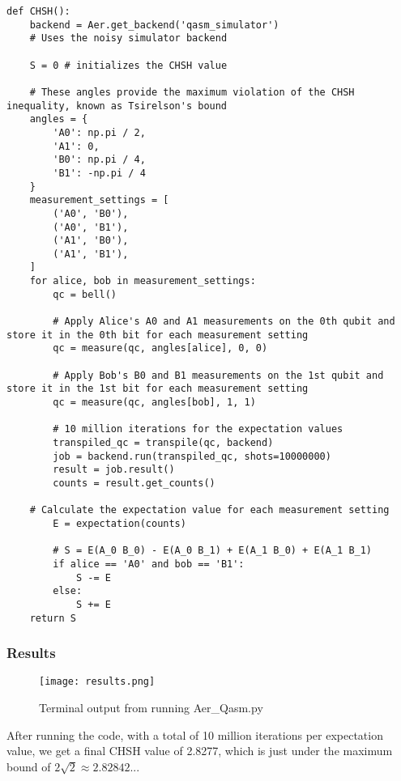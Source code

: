 \documentclass[12pt]{article}
\begin{document}
\newpage
\begin{lstlisting}[style=python]
def CHSH():
    backend = Aer.get_backend('qasm_simulator')
    # Uses the noisy simulator backend
    
    S = 0 # initializes the CHSH value

    # These angles provide the maximum violation of the CHSH inequality, known as Tsirelson's bound
    angles = {
        'A0': np.pi / 2,   
        'A1': 0,            
        'B0': np.pi / 4,   
        'B1': -np.pi / 4
    }
    measurement_settings = [
        ('A0', 'B0'),    
        ('A0', 'B1'),
        ('A1', 'B0'),
        ('A1', 'B1'),
    ]
    for alice, bob in measurement_settings:
        qc = bell()
        
        # Apply Alice's A0 and A1 measurements on the 0th qubit and store it in the 0th bit for each measurement setting
        qc = measure(qc, angles[alice], 0, 0)
        
        # Apply Bob's B0 and B1 measurements on the 1st qubit and store it in the 1st bit for each measurement setting
        qc = measure(qc, angles[bob], 1, 1)

        # 10 million iterations for the expectation values
        transpiled_qc = transpile(qc, backend)
        job = backend.run(transpiled_qc, shots=10000000) 
        result = job.result()
        counts = result.get_counts()
        
    # Calculate the expectation value for each measurement setting
        E = expectation(counts)

        # S = E(A_0 B_0) - E(A_0 B_1) + E(A_1 B_0) + E(A_1 B_1)
        if alice == 'A0' and bob == 'B1':  
            S -= E 
        else:  
            S += E
    return S
\end{lstlisting}

\subsubsection{Results}

\begin{figure}[h]
    \centering
    \texttt{[image: results.png]}
    \caption{Terminal output from running Aer\_Qasm.py}
    \label{fig:Qasm_results}
\end{figure}

After running the code, with a total of 10 million iterations per expectation value, we get a final CHSH value of 2.8277, which is just under the maximum bound of $2\sqrt{2} \approx 2.82842...$
\end{document}
